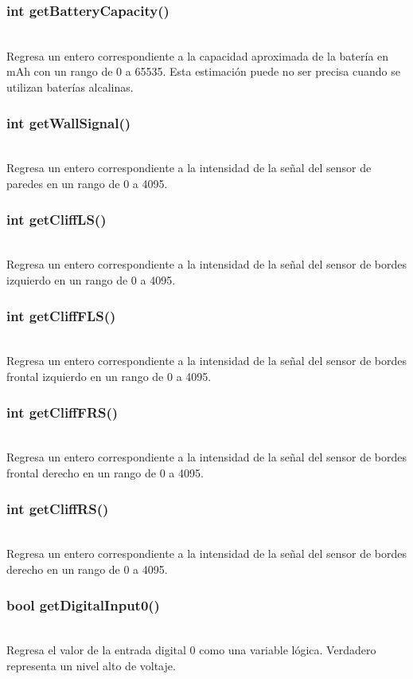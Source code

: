 \documentclass[letterpaper]{book}
\begin{document}
\subsubsection{int getBatteryCapacity()}\mbox{}\\
Regresa un entero correspondiente a la capacidad aproximada de la batería en mAh con un rango de 0 a 65535. Esta estimación puede no ser precisa cuando se utilizan baterías alcalinas.\\
\subsubsection{int getWallSignal()}\mbox{}\\
Regresa un entero correspondiente a la intensidad de la señal del sensor de paredes en un rango de 0 a 4095.\\
\subsubsection{int getCliffLS()}\mbox{}\\
Regresa un entero correspondiente a la intensidad de la señal del sensor de bordes izquierdo en un rango de 0 a 4095.\\
\subsubsection{int getCliffFLS()}\mbox{}\\
Regresa un entero correspondiente a la intensidad de la señal del sensor de bordes frontal izquierdo en un rango de 0 a 4095.\\
\subsubsection{int getCliffFRS()}\mbox{}\\
Regresa un entero correspondiente a la intensidad de la señal del sensor de bordes frontal derecho en un rango de 0 a 4095.\\
\subsubsection{int getCliffRS()}\mbox{}\\
Regresa un entero correspondiente a la intensidad de la señal del sensor de bordes derecho en un rango de 0 a 4095.\\
\subsubsection{	bool getDigitalInput0()}\mbox{}\\
Regresa el valor de la entrada digital 0 como una variable lógica. Verdadero representa un nivel alto de voltaje.\\
\end{document}
